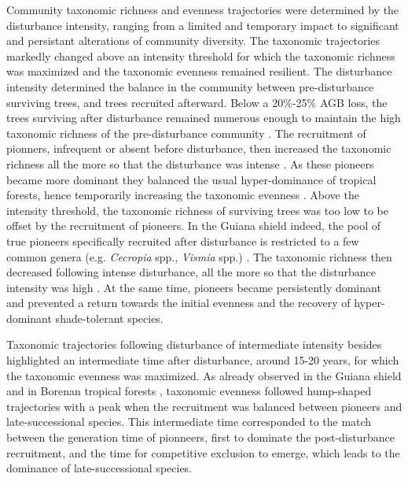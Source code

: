 \documentclass[fleqn,10pt]{ArtEcoFoG} %
\begin{document}
Community taxonomic richness and evenness trajectories were determined
by the disturbance intensity, ranging from a limited and temporary
impact to significant and persistant alterations of community diversity.
The taxonomic trajectories markedly changed above an intensity threshold
for which the taxonomic richness was maximized and the taxonomic
evenness remained resilient. The disturbance intensity determined the
balance in the community between pre-disturbance surviving trees, and
trees recruited afterward. Below a 20\%-25\% AGB loss, the trees
surviving after disturbance remained numerous enough to maintain the
high taxonomic richness of the pre-disturbance community
\citep{Bongers2009}. The recruitment of pionners, infrequent or absent
before disturbance, then increased the taxonomic richness all the more
so that the disturbance was intense \citep{Martin2015, Chaudhary2016}.
As these pioneers became more dominant they balanced the usual
hyper-dominance of tropical forests, hence temporarily increasing the
taxonomic evenness \citep{Baraloto2012a}. Above the intensity threshold,
the taxonomic richness of surviving trees was too low to be offset by
the recruitment of pioneers. In the Guiana shield indeed, the pool of
true pioneers specifically recruited after disturbance is restricted to
a few common genera (e.g. \emph{Cecropia} spp., \emph{Vismia} spp.)
\citep{Guitet2018}. The taxonomic richness then decreased following
intense disturbance, all the more so that the disturbance intensity was
high \citep{Molino2001}. At the same time, pioneers became persistently
dominant and prevented a return towards the initial evenness and the
recovery of hyper-dominant shade-tolerant species.

Taxonomic trajectories following disturbance of intermediate intensity
besides highlighted an intermediate time after disturbance, around 15-20
years, for which the taxonomic evenness was maximized. As already
observed in the Guiana shield \citep{Baraloto2012a} and in Borenan
tropical forests \citep{Cannon1998}, taxonomic evenness followed
hump-shaped trajectories with a peak when the recruitment was balanced
between pioneers and late-successional species. This intermediate time
corresponded to the match between the generation time of pionneers,
first to dominate the post-disturbance recruitment, and the time for
competitive exclusion to emerge, which leads to the dominance of
late-successional species.
\end{document}
